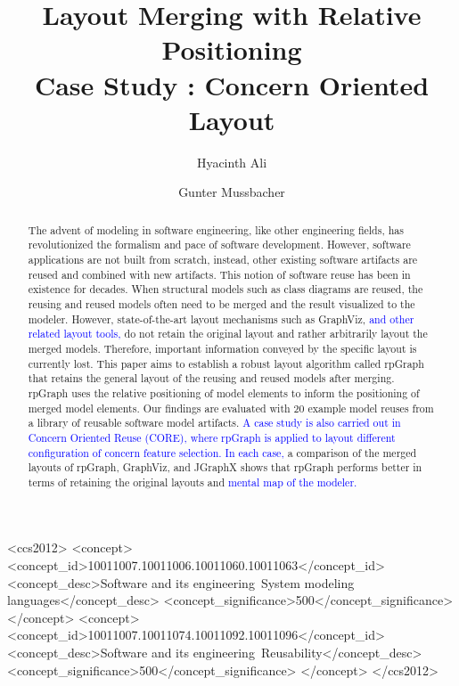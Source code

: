 \documentclass[sigconf]{acmart}
\newcommand{\haAction}[1]{\textcolor{blue}{#1}}
\begin{document}
\title{Layout Merging with Relative Positioning \\ Case Study : Concern Oriented Layout}

\author{Hyacinth Ali}

\author{Gunter Mussbacher}


\renewcommand{\shortauthors}{H. Ali, G. Mussbacher}


\begin{abstract}
The advent of modeling in software engineering, like other engineering fields, has revolutionized the formalism and pace of software development. However, software applications are not built from scratch, instead, other existing software artifacts are reused and combined with new artifacts. This notion of software reuse has been in existence for decades. When structural models such as class diagrams are reused, the reusing and reused models often need to be merged and the result visualized to the modeler. However, state-of-the-art layout mechanisms such as GraphViz, \haAction{and other related layout tools,} do not retain the original layout and rather arbitrarily layout the merged models. Therefore, important information conveyed by the specific layout is currently lost. This paper aims to establish a robust layout algorithm called rpGraph that retains the general layout of the reusing and reused models after merging. rpGraph uses the relative positioning of model elements to inform the positioning of merged model elements. Our findings are evaluated with 20 example model reuses from a library of reusable software model artifacts. \haAction{A case study is also carried out in Concern Oriented Reuse (CORE), where rpGraph is applied to layout different configuration of concern feature selection. In each case,} a comparison of the merged layouts of rpGraph, GraphViz, and JGraphX shows that rpGraph performs better in terms of retaining the original layouts and \haAction{mental map of the modeler.} 
\end{abstract}
%
%
 \begin{CCSXML}
<ccs2012>
<concept>
<concept_id>10011007.10011006.10011060.10011063</concept_id>
<concept_desc>Software and its engineering~System modeling languages</concept_desc>
<concept_significance>500</concept_significance>
</concept>
<concept>
<concept_id>10011007.10011074.10011092.10011096</concept_id>
<concept_desc>Software and its engineering~Reusability</concept_desc>
<concept_significance>500</concept_significance>
</concept>
</ccs2012>
\end{CCSXML}
\end{document}
